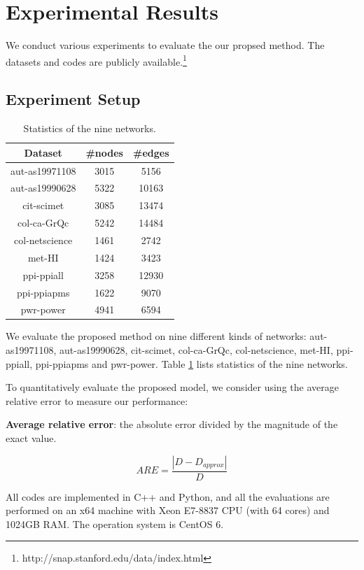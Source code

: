 \section{Experimental Results}
\label{sec:exp}

We conduct various experiments to evaluate the our propsed method.
The datasets and codes are publicly available.\footnote{http://snap.stanford.edu/data/index.html}

\subsection{Experiment Setup}

\begin{table}[t]
\centering
\begin{tabular}{c|c@{ }|c@{ }}
\hline
Dataset             &   \#nodes       &   \#edges \\ \hline
aut-as19971108 & 3015 & 5156 \\\hline
aut-as19990628 & 5322 & 10163 \\\hline
cit-scimet & 3085 & 13474 \\\hline
col-ca-GrQc & 5242 & 14484 \\\hline
col-netscience & 1461 & 2742 \\\hline
met-HI & 1424 & 3423 \\\hline
ppi-ppiall & 3258 & 12930 \\\hline
ppi-ppiapms & 1622 & 9070 \\\hline
pwr-power & 4941 & 6594 \\\hline
\end{tabular}
\caption{Statistics of the nine networks.}
\label{tb:statistics}
\end{table}


 We evaluate the proposed method on nine different kinds of networks: aut-as19971108, aut-as19990628, cit-scimet, col-ca-GrQc, col-netscience, met-HI, ppi-ppiall, ppi-ppiapms and pwr-power.
Table \ref{tb:statistics} lists statistics of the nine networks. 

 To quantitatively evaluate the proposed model, we consider using the average relative error to measure our performance:

\textbf{Average relative error}: the absolute error divided by the magnitude of the exact value.

$$ARE = \frac{|D - D_{approx}|}{D}$$

All codes are implemented in C++ and Python, and all the evaluations are performed on an x64 machine with Xeon E7-8837 CPU (with 64 cores) and 1024GB RAM. The operation system is CentOS 6. 

